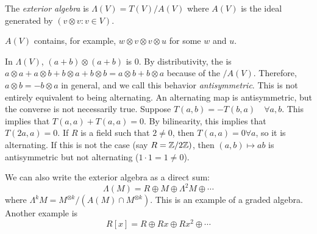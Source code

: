 \documentclass[a4paper,twoside,master.tex]{subfiles}
\begin{document}
\begin{definition}
    The \textit{exterior algebra} is $ \Lambda(V) = T(V) / A(V) $ where $ A(V) $ is the ideal generated by $ (v \otimes v\colon v \in V) $. 

    $ A(V) $ contains, for example, $ w \otimes v \otimes v \otimes u $ for some $ w $ and $ u $. 
\end{definition}

In $ \Lambda(V) $, $ (a + b) \otimes (a + b) $ is $ 0 $. By distributivity, the is $ a \otimes a + a \otimes b + b \otimes a + b \otimes b = a \otimes b + b \otimes a $ because of the $ / A(V) $. Therefore, $ a \otimes b = - b \otimes a $ in general, and we call this behavior \textit{antisymmetric}. This is not entirely equivalent to being alternating. An alternating map is antisymmetric, but the converse is not necessarily true. Suppose $ T(a,b) = -T(b,a) \quad\forall a, b $. This implies that $ T(a,a) + T(a,a) = 0 $. By bilinearity, this implies that $ T(2a,a) = 0 $. If $ R $ is a field such that $ 2 \neq 0 $, then $ T(a,a) = 0\forall a $, so it is alternating. If this is not the case (say $ R = \mathbb{Z}/2\mathbb{Z}) $, then $ (a,b)\mapsto ab $ is antisymmetric but not alternating ($ 1 \cdot 1 = 1 \neq 0 $).

We can also write the exterior algebra as a direct sum:
\begin{equation}
    \Lambda(M) = R \oplus M \oplus \Lambda^2 M \oplus \cdots
\end{equation}
where $ \Lambda^k M = M^{\otimes k} / (A(M) \cap M^{\otimes k}) $. This is an example of a graded algebra. Another example is
\begin{equation}
    R[x] = R \oplus Rx \oplus Rx^2 \oplus \cdots
\end{equation}
\end{document}
